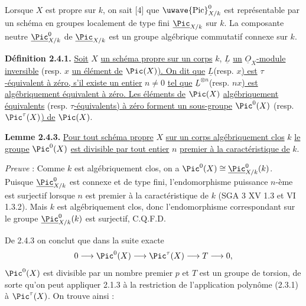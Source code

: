 


Lorsque \(X\) est propre sur \(k\), on sait [4] que \(\text{\uwave{Pic}}^0_{X/k}\) est représentable par un schéma en groupes localement de type fini \(\underline{\Pic}_{X/k}\) sur \(k\). La composante neutre \(\underline{\Pic}^0_{X/k}\) de \(\underline{\Pic}_{X/k}\) est un groupe algébrique commutatif connexe sur \(k\).

\textbf{Définition 2.4.1.} \uline{Soit} \(X\) \uline{un schéma propre sur un corps} \(k\), \(\underline{L}\) \uline{un} \(\underline{O}_X\)\uline{-module inversible} (resp. \(x\) \uline{un élément de} \(\Pic(X)\)\uline{). On dit que} \(\underline{L}\)(resp. \(x\)\uline{) est} \(\tau\)\uline{-équivalent à zéro, s'il existe un entier} \(n\ne0\) \uline{tel que} \(\underline{L}^{\otimes n}\)(resp. \(nx\)\uline{) est algébriquement équivalent à zéro. Les éléments de} \(\Pic(X)\) \uline{algébriquement équivalents} (resp. \(\tau\)\uline{-équivalents) à zéro forment un sous-groupe} \(\Pic^0(X)\) (resp. \(\Pic^\tau(X)\)\uline{) de} \(\Pic(X)\).

\textbf{Lemme 2.4.3.} \uline{Pour tout schéma propre} \(X\) \uline{sur un corps algébriquement clos} \(k\) \uline{le groupe} \(\Pic^0(X)\) \uline{est divisible par tout entier} \(n\) \uline{premier à la caractéristique de} \(k\).

\emph{Preuve} : Comme \(k\) est algébriquement clos, on a \(\Pic^0(X)\cong \underline{\Pic}^0_{X/k}(k)\). Puisque \(\underline{\Pic}^0_{X/k}\) est connexe et de type fini, l'endomorphisme puissance \(n\)-ème est surjectif lorsque \(n\) est premier à la caractéristique de \(k\) (SGA 3 XV 1.3 et VI 1.3.2). Mais \(k\) est algébriquement clos, donc l'endomorphisme correspondant sur le groupe \(\underline{\Pic}^0_{X/k}(k)\) est surjectif, C.Q.F.D.

De 2.4.3 on conclut que dans la suite exacte
\[
0\longrightarrow\Pic^0(X)\longrightarrow\Pic^\tau(X)\longrightarrow T\longrightarrow0,
\]
\(\Pic^0(X)\) est divisible par un nombre premier \(p\) et \(T\) est un groupe de torsion, de sorte qu'on peut appliquer 2.1.3 à la restriction de l'application polynôme (2.3.1) à \(\Pic^\tau(X)\). On trouve ainsi :

